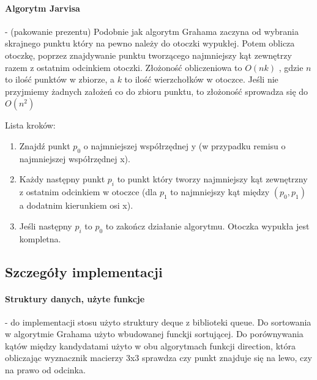 \documentclass[12pt, a4paper]{article}
\begin{document}
\paragraph{Algorytm Jarvisa} - (pakowanie prezentu) Podobnie jak algorytm Grahama zaczyna od wybrania skrajnego punktu który na pewno
należy do otoczki wypukłej. Potem oblicza otoczkę, poprzez znajdywanie punktu tworzącego najmniejszy 
kąt zewnętrzy razem z ostatnim odcinkiem otoczki. Złożoność obliczeniowa to $O(nk)$ , gdzie $n$ to ilość punktów w zbiorze, a $k$ to
ilość wierzchołków w otoczce. Jeśli nie przyjmiemy żadnych założeń co do zbioru punktu, to złożoność sprowadza się do $O(n^{2})$

\noindent
Lista kroków:
\begin{enumerate}
    \item Znajdź punkt $p_{0}$ o najmniejszej współrzędnej y (w przypadku remisu o najmniejszej współrzędnej x).
    \item Każdy następny punkt $p_{i}$ to punkt który tworzy najmniejszy kąt zewnętrzny z ostatnim odcinkiem w otoczce (dla $p_{1}$ to
    najmniejszy kąt między $(p_{0},p_{1})$ a dodatnim kierunkiem osi x).
    \item Jeśli następny $p_{i}$ to $p_{0}$ to zakończ działanie algorytmu. Otoczka wypukła jest kompletna.
\end{enumerate}

\subsection{Szczegóły implementacji}
\paragraph{Struktury danych, użyte funkcje} - do implementacji stosu użyto struktury deque z biblioteki queue. Do sortowania w
algorytmie Grahama użyto wbudowanej funckji sortującej. Do porównywania kątów między kandydatami użyto w obu algorytmach funkcji
direction, która obliczając wyznacznik macierzy 3x3 sprawdza czy punkt znajduje się na lewo, czy na prawo od odcinka.
\end{document}
